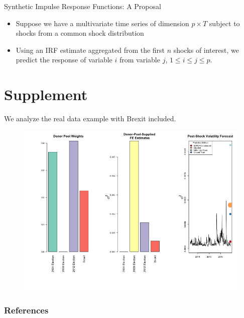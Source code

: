 \documentclass[9pt]{beamer}
\theoremstyle{definition}
\begin{document}
\begin{frame}{Synthetic Impulse Response Functions: A Proposal}
    \begin{itemize}
        \item Suppose we have a multivariate time series of dimension $p \times T$ subject to shocks from a common shock distribution
        \item Using an IRF estimate aggregated from the first $n$ shocks of interest, we predict the response of variable $i$ from variable $j$, $1\leq i \leq j \leq p$. 
    \end{itemize}
    
\end{frame}
\section{Supplement}
We analyze the real data example with Brexit included.

\begin{figure}[H]
    \begin{center}
      \includegraphics[scale=.32]{real_data_output_plots/savetime_SunMar172251232024_IYG_6B=F-CL=F-^VIX-^IRX-^FVX-^TNX-^TYX_^VIX_2016-11-08-2004-11-02-2008-11-04-2012-11-06-2016-06-22.png}
      \end{center}
    \end{figure}
    

\begin{frame}[t,allowframebreaks]
    \frametitle{References}

\printbibliography[heading=none]
\end{frame}
\end{document}

